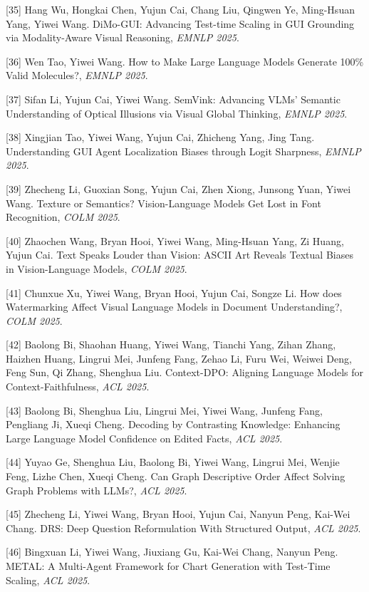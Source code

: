 [35] Hang Wu, Hongkai Chen, Yujun Cai, Chang Liu, Qingwen Ye, Ming-Hsuan Yang, Yiwei Wang. DiMo-GUI: Advancing Test-time Scaling in GUI Grounding via Modality-Aware Visual Reasoning, \textit{EMNLP 2025}.

[36] Wen Tao, Yiwei Wang. How to Make Large Language Models Generate 100\% Valid Molecules?, \textit{EMNLP 2025}.

[37] Sifan Li, Yujun Cai, Yiwei Wang. SemVink: Advancing VLMs' Semantic Understanding of Optical Illusions via Visual Global Thinking, \textit{EMNLP 2025}.

[38] Xingjian Tao, Yiwei Wang, Yujun Cai, Zhicheng Yang, Jing Tang. Understanding GUI Agent Localization Biases through Logit Sharpness, \textit{EMNLP 2025}.

[39] Zhecheng Li, Guoxian Song, Yujun Cai, Zhen Xiong, Junsong Yuan, Yiwei Wang. Texture or Semantics? Vision-Language Models Get Lost in Font Recognition, \textit{COLM 2025}.

[40] Zhaochen Wang, Bryan Hooi, Yiwei Wang, Ming-Hsuan Yang, Zi Huang, Yujun Cai. Text Speaks Louder than Vision: ASCII Art Reveals Textual Biases in Vision-Language Models, \textit{COLM 2025}.

[41] Chunxue Xu, Yiwei Wang, Bryan Hooi, Yujun Cai, Songze Li. How does Watermarking Affect Visual Language Models in Document Understanding?, \textit{COLM 2025}.

[42] Baolong Bi, Shaohan Huang, Yiwei Wang, Tianchi Yang, Zihan Zhang, Haizhen Huang, Lingrui Mei, Junfeng Fang, Zehao Li, Furu Wei, Weiwei Deng, Feng Sun, Qi Zhang, Shenghua Liu. Context-DPO: Aligning Language Models for Context-Faithfulness, \textit{ACL 2025}.

[43] Baolong Bi, Shenghua Liu, Lingrui Mei, Yiwei Wang, Junfeng Fang, Pengliang Ji, Xueqi Cheng. Decoding by Contrasting Knowledge: Enhancing Large Language Model Confidence on Edited Facts, \textit{ACL 2025}.

[44] Yuyao Ge, Shenghua Liu, Baolong Bi, Yiwei Wang, Lingrui Mei, Wenjie Feng, Lizhe Chen, Xueqi Cheng. Can Graph Descriptive Order Affect Solving Graph Problems with LLMs?, \textit{ACL 2025}.

[45] Zhecheng Li, Yiwei Wang, Bryan Hooi, Yujun Cai, Nanyun Peng, Kai-Wei Chang. DRS: Deep Question Reformulation With Structured Output, \textit{ACL 2025}.

[46] Bingxuan Li, Yiwei Wang, Jiuxiang Gu, Kai-Wei Chang, Nanyun Peng. METAL: A Multi-Agent Framework for Chart Generation with Test-Time Scaling, \textit{ACL 2025}.

